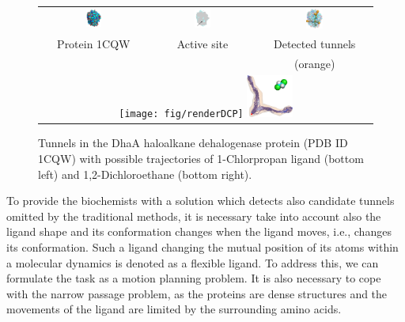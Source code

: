 \documentclass[usletter, 10pt, conference]{ieeeconf} %
\begin{document}
\begin{figure}[t]
\centering
{\footnotesize
\renewcommand{\arraystretch}{-0.5}
\renewcommand{\tabcolsep}{-1pt}
\begin{tabular}{ccc}
\includegraphics[width=0.15\textwidth]{fig/motiv1} &
\includegraphics[width=0.17\textwidth]{fig/motiv2lab} &
\includegraphics[width=0.16\textwidth]{fig/motiv3}  \\
Protein 1CQW & Active site & Detected tunnels \\ %
             &            & (orange)         \\  %
\multicolumn{3}{c}{%
\texttt{[image: fig/renderDCP]}  \hskip 15pt
\includegraphics[width=0.14\textwidth]{fig/render37t}} \\ 
\end{tabular}
}
\caption{\label{fig::motiv}
    Tunnels in the DhaA haloalkane dehalogenase protein (PDB ID 1CQW) with possible trajectories of 1-Chlorpropan ligand (bottom left) and 1,2-Dichloroethane (bottom right).
}
\end{figure}


To provide the biochemists with a solution which detects also candidate tunnels omitted by the traditional methods, it is necessary take into account also the ligand shape and its conformation changes when the ligand moves, i.e., changes its conformation.
Such a ligand changing the mutual position of its atoms within a molecular dynamics is denoted as a flexible ligand.
To address this, we can formulate the task as a motion planning problem.
It is also necessary to cope with the narrow passage problem, as the proteins are dense structures and the movements of the ligand are limited by the surrounding amino acids.
\end{document}
